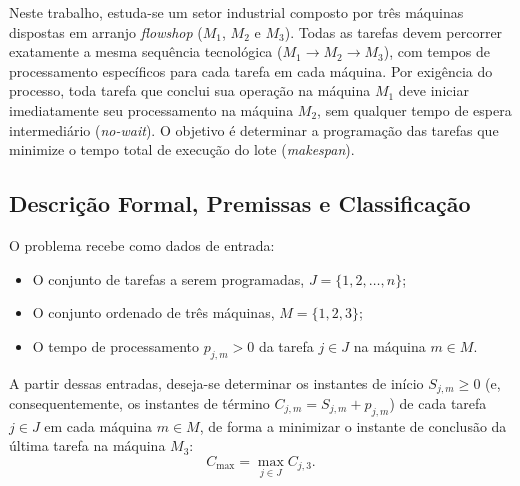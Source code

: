 \documentclass[11pt,a4paper]{article}
\begin{document}
Neste trabalho, estuda-se um setor industrial composto por três máquinas dispostas em arranjo \textit{flowshop} ($M_1$, $M_2$ e $M_3$). Todas as tarefas devem percorrer exatamente a mesma sequência tecnológica ($M_1 \to M_2 \to M_3$), com tempos de processamento específicos para cada tarefa em cada máquina. Por exigência do processo, toda tarefa que conclui sua operação na máquina $M_1$ deve iniciar imediatamente seu processamento na máquina $M_2$, sem qualquer tempo de espera intermediário (\textit{no-wait}). O objetivo é determinar a programação das tarefas que minimize o tempo total de execução do lote (\textit{makespan}).

\subsection{Descrição Formal, Premissas e Classificação}
O problema recebe como dados de entrada:
\begin{itemize}
    \item O conjunto de tarefas a serem programadas, $J = \{1, 2, \dots, n\}$;
    \item O conjunto ordenado de três máquinas, $M = \{1, 2, 3\}$;
    \item O tempo de processamento $p_{j,m} > 0$ da tarefa $j \in J$ na máquina $m \in M$.
\end{itemize}

A partir dessas entradas, deseja-se determinar os instantes de início $S_{j,m} \ge 0$ (e, consequentemente, os instantes de término $C_{j,m} = S_{j,m} + p_{j,m}$) de cada tarefa $j \in J$ em cada máquina $m \in M$, de forma a minimizar o instante de conclusão da última tarefa na máquina $M_3$:
\begin{equation}
    C_{\max} = \max_{j \in J} C_{j,3}.
\end{equation}
\end{document}
